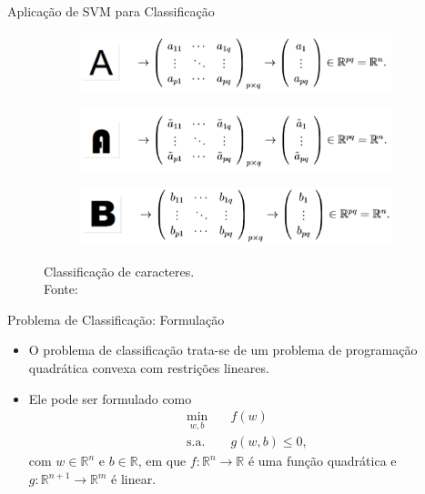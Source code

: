 \documentclass{beamer}
\def\RR{\mathds{R}}
\theoremstyle{definition}%
\begin{document}
\begin{frame}{Aplicação de SVM para Classificação}
\begin{figure}[H]
	\centering
	\begin{subfigure}[h]{0.8\textwidth}
		\centering
		\includegraphics[width=\textwidth]{letraA_1.png}
	\end{subfigure}
	\begin{subfigure}[!h]{0.8\textwidth}
		\centering
		\includegraphics[width=\textwidth]{letraA_2.png}
	\end{subfigure}
	\begin{subfigure}[!h]{0.8\textwidth}
		\centering
		\includegraphics[width=\textwidth]{letraB.png}
	\end{subfigure}
	\caption{Classificação de caracteres. \\ Fonte: \textcite{Evelin2017}}
\end{figure}
\end{frame}


\begin{frame}{Problema de Classificação: Formulação}
\begin{block}{}
\begin{itemize}
	\item O problema de classificação trata-se de um problema de programação quadrática convexa com restrições lineares.

	\item Ele pode ser formulado como
\[
\begin{aligned}
\min_{w,b} & \quad f(w) \\
\text{s.a.} &  \quad g(w,b) \leq 0, \end{aligned}
\]
com $w\in \RR^n$ e $b\in \RR $, em que $f: \RR^{n} \rightarrow \RR$ é uma função quadrática e $g: \RR^{n+1} \rightarrow \RR^m$ é linear.
\end{itemize}
\end{block}
\end{frame}
\end{document}
